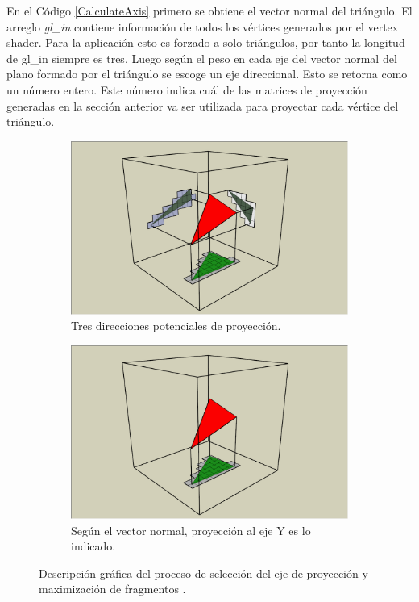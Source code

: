 En el Código \ref{CalculateAxis} primero se obtiene el vector normal del triángulo. El arreglo \emph{gl\_in} contiene información de todos los vértices generados por el vertex shader. Para la aplicación esto es forzado a solo triángulos, por tanto la longitud de gl\_in siempre es tres. Luego según el peso en cada eje del vector normal del plano formado por el triángulo se escoge un eje direccional. Esto se retorna como un número entero. Este número indica cuál de las matrices de proyección generadas en la sección anterior va ser utilizada para proyectar cada vértice del triángulo.

\begin{figure}[H]
	\centering
	\begin{subfigure}[t]{.49\linewidth}
		\centering
		\captionsetup{justification=centering}
		\includegraphics[width=\linewidth]{media/Voxelization_blog_fig_5.png}
		\caption*{Tres direcciones potenciales de proyección.}
	\end{subfigure}%
	\hspace{0.01\textwidth}
	\begin{subfigure}[t]{.49\linewidth}
		\centering
		\captionsetup{justification=centering}
		\includegraphics[width=\linewidth]{media/Voxelization_blog_fig_6.png}
		\caption*{Según el vector normal, proyección al eje Y es lo indicado.}
	\end{subfigure}%
	\caption{Descripción gráfica del proceso de selección del eje de proyección y maximización de fragmentos \cite{gpuvoxelization}.}
	\label{fig:axis_selection}
\end{figure}

